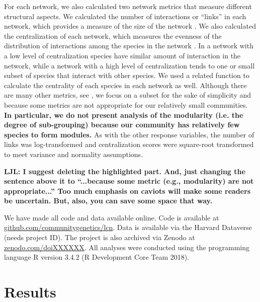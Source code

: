 \documentclass[9pt,twocolumn,twoside,lineno]{pnas-new}
\begin{document}
{For each network, we also calculated two network metrics that measure
different structural aspects. We calculated the number of interactions
or ``links'' in each network, which provides a measure of the size of
the network \citep{Lau2015, Borrett2015}. We also calculated the
centralization of each network, which measures the evenness of the
distribution of interactions among the species in the network
\cite{Butts2005}. In a network with a low level of centralization
species have similar amount of interaction in the network, while a
network with a high level of centralization tends to one or small
subset of species that interact with other species. We used a related
function to calculate the centrality of each species in each network
as well. Although there are many other metrics, see \citep{Lau2017a},
we focus on a subset for the sake of simplicity and because some
metrics are not appropriate for our relatively small
communities. \textbf{In particular, we do not present analysis of the
  modularity (i.e. the degree of sub-grouping) because our community
  has relatively few species to form modules.} As with the other
response variables, the number of links was log-transformed and
centralization scores were square-root transformed to meet variance
and normality assumptions.

\textbf{LJL: I suggest deleting the highlighted part. And, just
  changing the sentence above it to “...because some metric (e.g.,
  modularity) are not appropriate...”  Too much emphasis on caviots
  will make some readers be uncertain. But, also, you can save some
  space that way.}

We have made all code and data available online. Code is available at
\url{github.com/communitygenetics/lcn}. Data is available via the
Harvard Dataverse (needs project ID). The project is also archived via
Zenodo at \url{zenodo.com/doiXXXXXX}. All analyses were conducted
using the programming language R version 3.4.2 (R Development Core
Team 2018).

\section*{Results}




}
\end{document}
